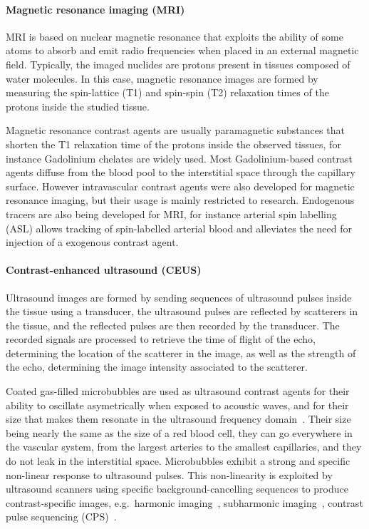 \paragraph{Magnetic resonance imaging (MRI)}
\label{sec:IntroMR}
MRI is based on nuclear magnetic resonance that exploits the ability of some atoms to absorb and emit radio frequencies when placed in an external magnetic field.
Typically, the imaged nuclides are protons present in tissues composed of water molecules.
In this case, magnetic resonance images are formed by measuring the spin-lattice (T1) and spin-spin (T2) relaxation times of the protons inside the studied tissue.

Magnetic resonance contrast agents are usually paramagnetic substances that shorten the T1 relaxation time of the protons inside the observed tissues, for instance Gadolinium chelates are widely used.
Most Gadolinium-based contrast agents diffuse from the blood pool to the interstitial space through the capillary surface.
However intravascular contrast agents were also developed for magnetic resonance imaging, but their usage is mainly restricted to research.
Endogenous tracers are also being developed for MRI, for instance arterial spin labelling (ASL) allows tracking of spin-labelled arterial blood and alleviates the need for injection of a exogenous contrast agent.

\paragraph{Contrast-enhanced ultrasound (CEUS)}
\label{sec:IntroCEUS}
Ultrasound images are formed by sending sequences of ultrasound pulses inside the tissue using a transducer, the ultrasound pulses are reflected by scatterers in the tissue, and the reflected pulses are then recorded by the transducer.
The recorded signals are processed to retrieve the time of flight of the echo, determining the location of the scatterer in the image, as well as the strength of the echo, determining the image intensity associated to the scatterer.

Coated gas-filled microbubbles are used as ultrasound contrast agents for their ability to oscillate asymetrically when exposed to acoustic waves, and for their size that makes them resonate in the ultrasound frequency domain~\cite{Greis:2004ub}.
Their size being nearly the same as the size of a red blood cell, they can go everywhere in the vascular system, from the largest arteries to the smallest capillaries, and they do not leak in the interstitial space.
Microbubbles exhibit a strong and specific non-linear response to ultrasound pulses.
This non-linearity is exploited by ultrasound scanners using specific background-cancelling sequences to produce contrast-specific images, e.g.~harmonic imaging~\cite{Meairs:2000eq}, subharmonic imaging~\cite{Eisenbrey:2015gk}, contrast pulse sequencing (CPS)~\cite{Phillips:2004ke}.

